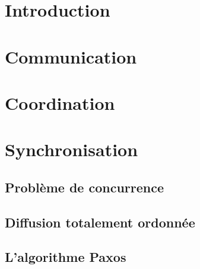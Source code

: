
\begingroup

\section{Introduction}

\section{Communication}

\section{Coordination}

\section{Synchronisation}

\subsection{Problème de concurrence}


\subsection{Diffusion totalement ordonnée}




 
\subsection{L'algorithme Paxos}



  
\endgroup

\endinput
